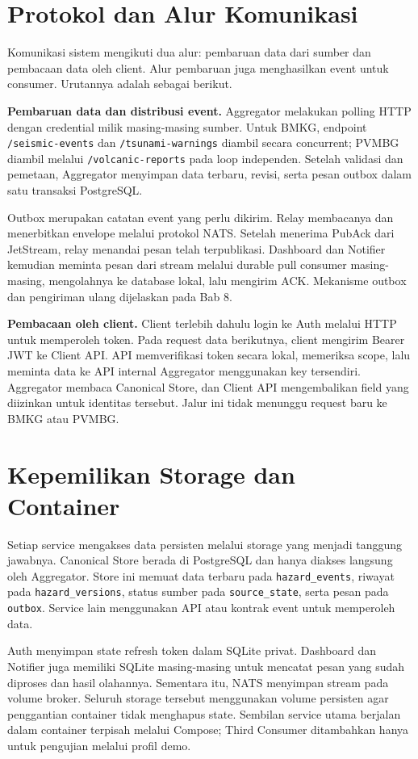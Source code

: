 \section{Protokol dan Alur Komunikasi}
Komunikasi sistem mengikuti dua alur: pembaruan data dari sumber dan pembacaan data oleh client. Alur pembaruan juga menghasilkan event untuk consumer. Urutannya adalah sebagai berikut.

\textbf{Pembaruan data dan distribusi event.} Aggregator melakukan polling HTTP dengan credential milik masing-masing sumber. Untuk BMKG, endpoint \texttt{/seismic-events} dan \texttt{/tsunami-warnings} diambil secara concurrent; PVMBG diambil melalui \texttt{/volcanic-reports} pada loop independen. Setelah validasi dan pemetaan, Aggregator menyimpan data terbaru, revisi, serta pesan outbox dalam satu transaksi PostgreSQL.

Outbox merupakan catatan event yang perlu dikirim. Relay membacanya dan menerbitkan envelope melalui protokol NATS. Setelah menerima PubAck dari JetStream, relay menandai pesan telah terpublikasi. Dashboard dan Notifier kemudian meminta pesan dari stream melalui durable pull consumer masing-masing, mengolahnya ke database lokal, lalu mengirim ACK. Mekanisme outbox dan pengiriman ulang dijelaskan pada Bab 8.

\textbf{Pembacaan oleh client.} Client terlebih dahulu login ke Auth melalui HTTP untuk memperoleh token. Pada request data berikutnya, client mengirim Bearer JWT ke Client API. API memverifikasi token secara lokal, memeriksa scope, lalu meminta data ke API internal Aggregator menggunakan key tersendiri. Aggregator membaca Canonical Store, dan Client API mengembalikan field yang diizinkan untuk identitas tersebut. Jalur ini tidak menunggu request baru ke BMKG atau PVMBG.

\section{Kepemilikan Storage dan Container}
Setiap service mengakses data persisten melalui storage yang menjadi tanggung jawabnya. Canonical Store berada di PostgreSQL dan hanya diakses langsung oleh Aggregator. Store ini memuat data terbaru pada \texttt{hazard\_events}, riwayat pada \texttt{hazard\_versions}, status sumber pada \texttt{source\_state}, serta pesan pada \texttt{outbox}. Service lain menggunakan API atau kontrak event untuk memperoleh data.

Auth menyimpan state refresh token dalam SQLite privat. Dashboard dan Notifier juga memiliki SQLite masing-masing untuk mencatat pesan yang sudah diproses dan hasil olahannya. Sementara itu, NATS menyimpan stream pada volume broker. Seluruh storage tersebut menggunakan volume persisten agar penggantian container tidak menghapus state. Sembilan service utama berjalan dalam container terpisah melalui Compose; Third Consumer ditambahkan hanya untuk pengujian melalui profil demo.


